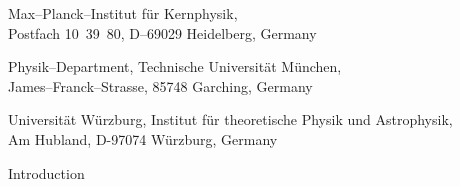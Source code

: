 \documentclass[12pt,a4paper]{article}
\makeatletter
\renewcommand{\section}{\@startsection{section}{1}{0em}{-\baselineskip}%
{\baselineskip}{\normalfont\large\bfseries}}
\newcommand{\GLOBES}{{\sf GLoBES}}
\newcommand{\GLOBESN}{{\sf GLoBES~3.0}}
\makeatother
\begin{document}
\begin{titlepage}
{\begin{center}
\vspace*{1mm}

\footnotemark[2]%
       Max--Planck--Institut f\"ur Kernphysik,  \\
       Postfach 10~39~80, D--69029 Heidelberg, Germany 

\vspace*{1mm}

\footnotemark[3]%
       Physik--Department, Technische Universit\"at M\"unchen, \\
       James--Franck--Strasse, 85748 Garching, Germany

\vspace*{1mm}

\footnotemark[4]%
       Universit\"at W\"urzburg, 
       Institut f\"ur theoretische Physik und Astrophysik, \\
       Am Hubland, D-97074 W\"urzburg, Germany

\end{center}}

\vspace*{1cm}


\begin{abstract}
We present Version 3.0 of the GLoBES (``General Long Baseline Experiment Simulator'') software, which is
a simulation tool for short- and long-baseline neutrino oscillation experiments. As a new feature, \GLOBESN\ allows for user-defined systematical errors, which can also be used to simulate experiments with
multiple discrete sources and detectors.
In addition, the combination with external information, such as from different experiment classes, is 
simplified. As far as the probability calculation is concerned, \GLOBES\ 
now provides an interface for the inclusion of non-standard physics without re-compilation of the software. 
The set of experiment prototypes coming with \GLOBES\ has been updated. For example, built-in fluxes are now
provided for the simulation of beta beams.
\end{abstract}


\vspace*{.5cm}


\end{titlepage}

\newpage

\renewcommand{\thefootnote}{\arabic{footnote}}
\setcounter{footnote}{0}

\section{Introduction}
\end{document}
